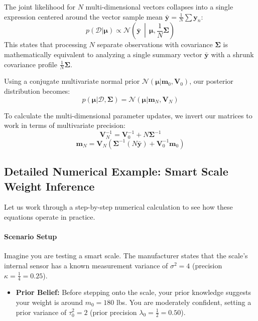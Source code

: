 \documentclass{article}
\begin{document}
The joint likelihood for $N$ multi-dimensional vectors collapses into a single expression centered around the vector sample mean $\bar{\mathbf{y}} = \frac{1}{N}\sum \mathbf{y}_n$:
\begin{equation}
p(\mathcal{D}|\boldsymbol{\mu}) \propto \mathcal{N}\left(\bar{\mathbf{y}}\,\middle|\,\boldsymbol{\mu}, \frac{1}{N}\boldsymbol{\Sigma}\right)
\end{equation}
This states that processing $N$ separate observations with covariance $\boldsymbol{\Sigma}$ is mathematically equivalent to analyzing a single summary vector $\bar{\mathbf{y}}$ with a shrunk covariance profile $\frac{1}{N}\boldsymbol{\Sigma}$.

Using a conjugate multivariate normal prior $\mathcal{N}(\boldsymbol{\mu}|\mathbf{m}_0, \mathbf{V}_0)$, our posterior distribution becomes:
\begin{equation}
p(\boldsymbol{\mu}|\mathcal{D}, \boldsymbol{\Sigma}) = \mathcal{N}(\boldsymbol{\mu}|\mathbf{m}_N, \mathbf{V}_N)
\end{equation}

To calculate the multi-dimensional parameter updates, we invert our matrices to work in terms of multivariate precision:
\begin{equation}
\mathbf{V}_N^{-1} = \mathbf{V}_0^{-1} + N\boldsymbol{\Sigma}^{-1}
\end{equation}
\begin{equation}
\mathbf{m}_N = \mathbf{V}_N \left( \boldsymbol{\Sigma}^{-1}(N\bar{\mathbf{y}}) + \mathbf{V}_0^{-1}\mathbf{m}_0 \right)
\end{equation}



\subsection{Detailed Numerical Example: Smart Scale Weight Inference}

Let us work through a step-by-step numerical calculation to see how these equations operate in practice.

\paragraph{Scenario Setup}
Imagine you are testing a smart scale. The manufacturer states that the scale's internal sensor has a known measurement variance of $\sigma^2 = 4$ (precision $\kappa = \frac{1}{4} = 0.25$).
\begin{itemize}
    \item \textbf{Prior Belief:} Before stepping onto the scale, your prior knowledge suggests your weight is around $m_0 = 180$ lbs. You are moderately confident, setting a prior variance of $\tau_0^2 = 2$ (prior precision $\lambda_0 = \frac{1}{2} = 0.50$).
\end{itemize}
\end{document}
